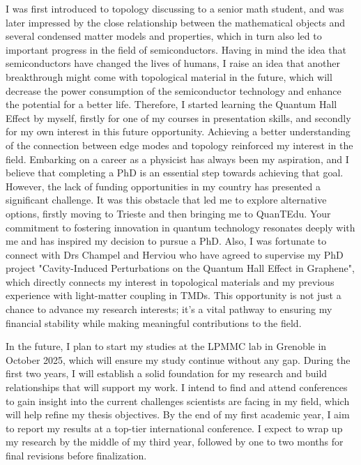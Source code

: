 \documentclass[a4paper]{article}
\begin{document}
I was first introduced to topology discussing to a senior math student, and was later impressed by the close relationship between the mathematical objects and several condensed matter models and properties, which in turn also led to important progress in the field of semiconductors. Having in mind the idea that semiconductors have changed the lives of humans, I raise an idea that another breakthrough might come with topological material in the future, which will decrease the power consumption of the semiconductor technology and enhance the potential for a better life. Therefore, I started learning the Quantum Hall Effect by myself, firstly for one of my courses in presentation skills, and secondly for my own interest in this future opportunity. Achieving a better understanding of the connection between edge modes and topology reinforced my interest in the field. Embarking on a career as a physicist has always been my aspiration, and I believe that completing a PhD is an essential step towards achieving that goal. However, the lack of funding opportunities in my country has presented a significant challenge. It was this obstacle that led me to explore alternative options, firstly moving to Trieste and then bringing me to QuanTEdu. Your commitment to fostering innovation in quantum technology resonates deeply with me and has inspired my decision to pursue a PhD. Also, I was fortunate to connect with Drs Champel and Herviou who have agreed to supervise my PhD project "Cavity-Induced Perturbations on the Quantum Hall Effect in Graphene", which directly connects my interest in topological materials and my previous experience with light-matter coupling in TMDs. This opportunity is not just a chance to advance my research interests; it's a vital pathway to ensuring my financial stability while making meaningful contributions to the field.\\\null\quad 

In the future, I plan to start my studies at the LPMMC lab in Grenoble in October 2025, which will ensure my study continue without any gap. During the first two years, I will establish a solid foundation for my research and build relationships that will support my work. I intend to find and attend conferences to gain insight into the current challenges scientists are facing in my field, which will help refine my thesis objectives. By the end of my first academic year, I aim to report my results at a top-tier international conference. I expect to wrap up my research by the middle of my third year, followed by one to two months for final revisions before finalization.\\\null\quad
\end{document}
